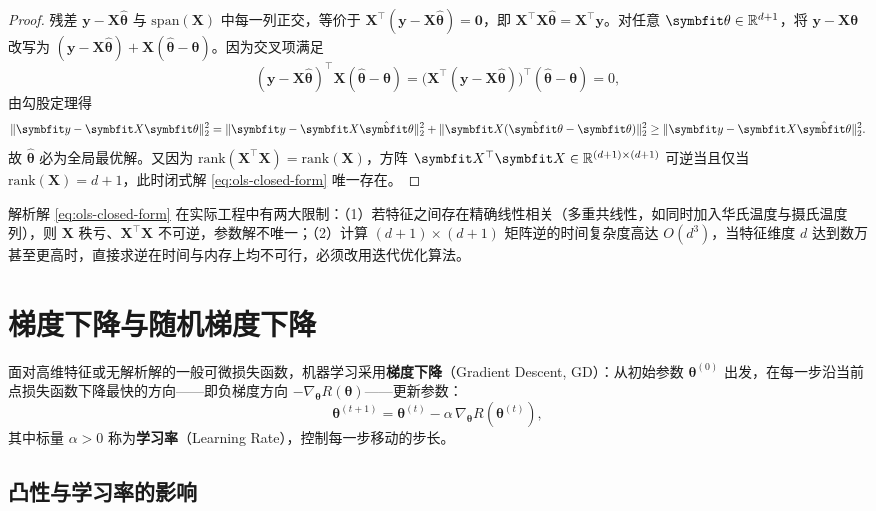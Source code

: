 \begin{proof}
残差 $\bm{y} - \bm{X}\hat{\bm{\theta}}$ 与 $\mathrm{span}(\bm{X})$ 中每一列正交，等价于 $\bm{X}^\top(\bm{y}-\bm{X}\hat{\bm{\theta}}) = \bm{0}$，即 $\bm{X}^\top\bm{X}\hat{\bm{\theta}} = \bm{X}^\top\bm{y}$。对任意 $\bm{\theta}\in\R^{d+1}$，将 $\bm{y}-\bm{X}\bm{\theta}$ 改写为 $(\bm{y}-\bm{X}\hat{\bm{\theta}}) + \bm{X}(\hat{\bm{\theta}}-\bm{\theta})$。因为交叉项满足
\[
  (\bm{y}-\bm{X}\hat{\bm{\theta}})^\top \bm{X}(\hat{\bm{\theta}}-\bm{\theta})
  = \bigl(\bm{X}^\top(\bm{y}-\bm{X}\hat{\bm{\theta}})\bigr)^\top (\hat{\bm{\theta}}-\bm{\theta}) = 0,
\]
由勾股定理得
\[
  \norm{\bm{y}-\bm{X}\bm{\theta}}_2^2
  = \norm{\bm{y}-\bm{X}\hat{\bm{\theta}}}_2^2 + \norm{\bm{X}(\hat{\bm{\theta}}-\bm{\theta})}_2^2
  \ge \norm{\bm{y}-\bm{X}\hat{\bm{\theta}}}_2^2.
\]
故 $\hat{\bm{\theta}}$ 必为全局最优解。又因为 $\mathrm{rank}(\bm{X}^\top\bm{X}) = \mathrm{rank}(\bm{X})$，方阵 $\bm{X}^\top\bm{X}\in\R^{(d+1)\times(d+1)}$ 可逆当且仅当 $\mathrm{rank}(\bm{X}) = d+1$，此时闭式解 \cref{eq:ols-closed-form} 唯一存在。
\end{proof}

\begin{pitfall}[多重共线性与解析解的计算瓶颈]\label{pit:ols-bottleneck}
解析解 \cref{eq:ols-closed-form} 在实际工程中有两大限制：（1）若特征之间存在精确线性相关（多重共线性，如同时加入华氏温度与摄氏温度列），则 $\bm{X}$ 秩亏、$\bm{X}^\top\bm{X}$ 不可逆，参数解不唯一；（2）计算 $(d+1)\times(d+1)$ 矩阵逆的时间复杂度高达 $O(d^3)$，当特征维度 $d$ 达到数万甚至更高时，直接求逆在时间与内存上均不可行，必须改用迭代优化算法。
\end{pitfall}

\section{梯度下降与随机梯度下降}\label{sec:gd-sgd}

面对高维特征或无解析解的一般可微损失函数，机器学习采用\textbf{梯度下降}（Gradient Descent, GD）：从初始参数 $\bm{\theta}^{(0)}$ 出发，在每一步沿当前点损失函数下降最快的方向——即负梯度方向 $-\nabla_{\bm{\theta}}R(\bm{\theta})$——更新参数：
\begin{equation}\label{eq:gd-update}
  \bm{\theta}^{(t+1)} = \bm{\theta}^{(t)} - \alpha\,\nabla_{\bm{\theta}}R(\bm{\theta}^{(t)}),
\end{equation}
其中标量 $\alpha > 0$ 称为\textbf{学习率}（Learning Rate），控制每一步移动的步长。

\subsection{凸性与学习率的影响}

